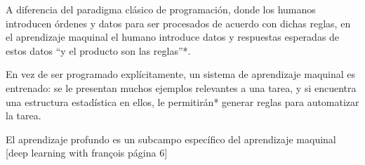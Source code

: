 A diferencia del paradigma clásico de programación, donde los humanos introducen órdenes y datos para ser procesados de acuerdo con dichas reglas, en el aprendizaje maquinal el humano introduce datos y respuestas esperadas de estos datos ``y el producto son las reglas''*.

En vez de ser programado explícitamente, un sistema de aprendizaje maquinal es entrenado: se le presentan muchos ejemplos relevantes a una tarea, y si encuentra una estructura estadística en ellos, le permitirán* generar reglas para automatizar la tarea.

El aprendizaje profundo es un subcampo específico del aprendizaje maquinal [deep learning with françois página 6]


